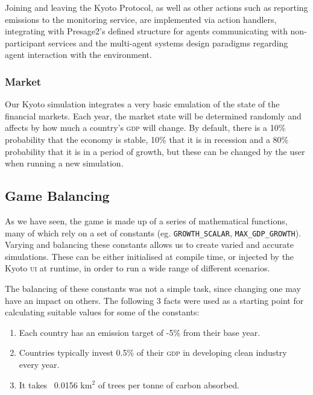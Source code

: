 Joining and leaving the Kyoto Protocol, as well as other actions such as reporting \CO emissions to the monitoring service, are implemented via action handlers, integrating with Presage2's defined structure for agents communicating with non-participant services and the multi-agent systems design paradigms regarding agent interaction with the environment.

\subsubsection{Market}

Our Kyoto simulation integrates a very basic emulation of the state of the financial markets. Each year, the market state will be determined randomly and affects by how much a country's \textsc{gdp} will change. By default, there is a 10\% probability that the economy is stable, 10\% that it is in recession and a 80\% probability that it is in a period of growth, but these can be changed by the user when running a new simulation.

\subsection{Game Balancing}

As we have seen, the game is made up of a series of mathematical functions, many of which rely on a set of constants (eg. \texttt{GROWTH\_SCALAR}, \texttt{MAX\_GDP\_GROWTH}). Varying and balancing these constants allows us to create varied and accurate simulations. These can be either initialised at compile time, or injected by the Kyoto \textsc{ui} at runtime, in order to run a wide range of different scenarios.

The balancing of these constants was not a simple task, since changing one may have an impact on others. The following 3 facts were used as a starting point for calculating suitable values for some of the constants:

\begin{enumerate}
\item Each country has an emission target of -5\% from their base year.
\item Countries typically invest 0.5\% of their \textsc{gdp} in developing clean industry every year.\cite[Figure 12]{PEW-Environment}
\item It takes ~0.0156 km$^{2}$ of trees per tonne of carbon absorbed.\cite[Accessed Jun 2012]{Trees-in-Trust}
\end{enumerate}
  
